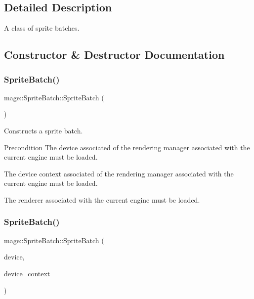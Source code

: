 \subsection{Detailed Description}
A class of sprite batches. 

\subsection{Constructor \& Destructor Documentation}
\hypertarget{classmage_1_1_sprite_batch_a75924326627c792ff454d9d2a2ba1fda}{}\label{classmage_1_1_sprite_batch_a75924326627c792ff454d9d2a2ba1fda} 
\subsubsection{\texorpdfstring{Sprite\+Batch()}{SpriteBatch()}\hspace{0.1cm}{\footnotesize\ttfamily [1/4]}}
{\footnotesize\ttfamily mage\+::\+Sprite\+Batch\+::\+Sprite\+Batch (\begin{DoxyParamCaption}{ }\end{DoxyParamCaption})}

Constructs a sprite batch.

\begin{DoxyPrecond}{Precondition}
The device associated of the rendering manager associated with the current engine must be loaded. 

The device context associated of the rendering manager associated with the current engine must be loaded. 

The renderer associated with the current engine must be loaded. 
\end{DoxyPrecond}
\hypertarget{classmage_1_1_sprite_batch_a3ab8db2b1f022518a1e29b8e048a09da}{}\label{classmage_1_1_sprite_batch_a3ab8db2b1f022518a1e29b8e048a09da} 
\subsubsection{\texorpdfstring{Sprite\+Batch()}{SpriteBatch()}\hspace{0.1cm}{\footnotesize\ttfamily [2/4]}}
{\footnotesize\ttfamily mage\+::\+Sprite\+Batch\+::\+Sprite\+Batch (\begin{DoxyParamCaption}\item[{I\+D3\+D11\+Device5 $\ast$}]{device,  }\item[{I\+D3\+D11\+Device\+Context4 $\ast$}]{device\+\_\+context }\end{DoxyParamCaption})}

